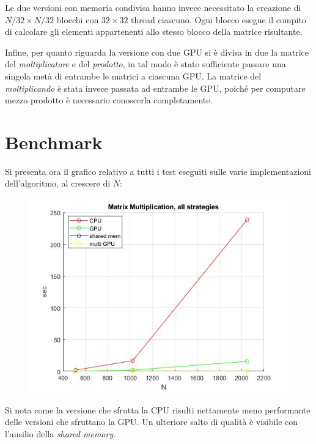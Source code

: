 \documentclass[12pt]{article}
\begin{document}
Le due versioni con memoria condivisa hanno invece necessitato la creazione di $N/32 \times N/32$ blocchi con $32 \times 32 $ thread ciascuno. Ogni blocco esegue il compito di calcolare gli elementi appartenenti allo stesso blocco della matrice risultante.

Infine, per quanto riguarda la versione con due GPU si è divisa in due la matrice del \emph{moltiplicatore} e del \emph{prodotto}, in tal modo è stato sufficiente passare una singola metà di entrambe le matrici a ciascuna GPU. La matrice del \emph{moltiplicando} è stata invece passata ad entrambe le GPU, poiché per computare mezzo prodotto è necessario conoscerla completamente.

\section{Benchmark}
Si presenta ora il grafico relativo a tutti i test eseguiti sulle varie implementazioni dell'algoritmo, al crescere di $N$:
\begin{figure}[h]
\includegraphics[width=\textwidth]{MatrixMul_all.jpg}
\centering
\end{figure}

Si nota come la versione che sfrutta la CPU risulti nettamente meno performante delle versioni che sfruttano la GPU. Un ulteriore salto di qualità è visibile con l'ausilio della \emph{shared memory}.
\end{document}
